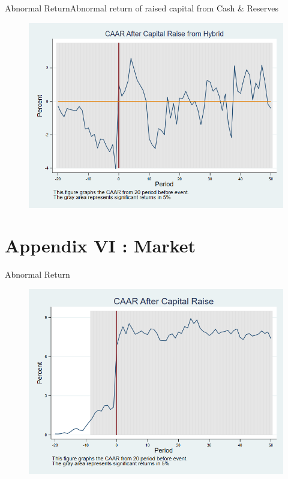 \documentclass{beamer}
\begin{document}
	
	\begin{frame}{Abnormal Return}{Abnormal return of raised capital from Cash \& Reserves}
		\label{car_4factorHybrid}
		\begin{figure}
			\centering
			\includegraphics[width=0.65\linewidth]{Output/car_4factorHybrid.png}
			\label{fig:car_4factorHybrid}
		\end{figure}
		
	\end{frame}
	
	
	\section{Appendix VI : Market}
	
	\begin{frame}{Abnormal Return}
		\label{car_market}
		\begin{figure}
			\centering
			\includegraphics[width=0.7\linewidth]{Output/car_market.png}
			\label{fig:car_market}
		\end{figure}
	\end{frame}
	
\end{document}
